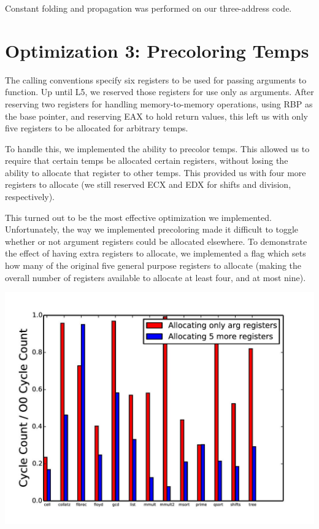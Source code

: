 \documentclass{article}
\begin{document}
Constant folding and propagation was performed on our three-address code.

\section{Optimization 3: Precoloring Temps}

The calling conventions specify six registers to be used for passing arguments to function. Up until L5, we reserved those registers for use only as arguments. After reserving two registers for handling memory-to-memory operations, using RBP as the base pointer, and reserving EAX to hold return values, this left us with only five registers to be allocated for arbitrary temps.

To handle this, we implemented the ability to precolor temps. This allowed us to require that certain temps be allocated certain registers, without losing the ability to allocate that register to other temps. This provided us with four more registers to allocate (we still reserved ECX and EDX for shifts and division, respectively). 

This turned out to be the most effective optimization we implemented. Unfortunately, the way we implemented precoloring made it difficult to toggle whether or not argument registers could be allocated elsewhere. To demonstrate the effect of having extra registers to allocate, we implemented a flag which sets how many of the original five general purpose registers to allocate (making the overall number of registers available to allocate at least four, and at most nine).

\includegraphics[scale=0.5]{allocating_more_regs-page-001}
\end{document}
